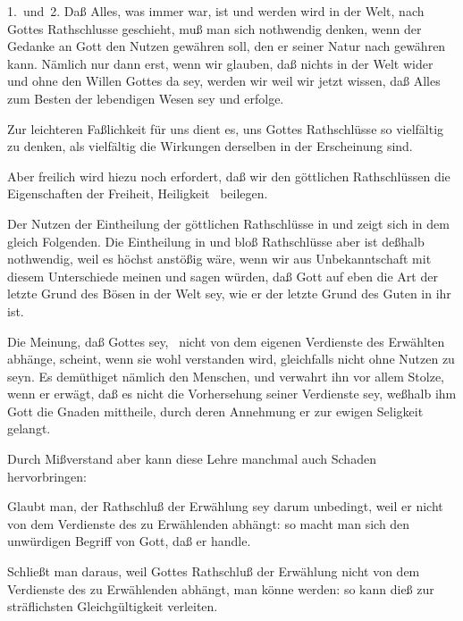 \begin{aufza}
\item[1.~und~2.] Daß Alles, was immer war, ist und werden wird in der Welt, nach Gottes Rathschlusse geschieht, muß man sich nothwendig denken, wenn der Gedanke an Gott den Nutzen gewähren soll, den er seiner Natur nach gewähren kann. Nämlich nur dann erst, wenn wir glauben, daß nichts in der Welt wider und ohne den Willen Gottes da sey, werden wir  weil wir jetzt wissen, daß Alles zum Besten der lebendigen Wesen sey und erfolge.
\item Zur leichteren Faßlichkeit für uns dient es, uns Gottes Rathschlüsse so vielfältig zu denken, als vielfältig die Wirkungen derselben in der Erscheinung sind.~
\item Aber freilich wird hiezu noch erfordert, daß wir den göttlichen Rathschlüssen die Eigenschaften der Freiheit, Heiligkeit \usw\ beilegen.
\item Der Nutzen der Eintheilung der göttlichen Rathschlüsse in  und  zeigt sich in dem gleich Folgenden. Die Eintheilung in  und bloß  Rathschlüsse aber ist deßhalb nothwendig, weil es höchst anstößig wäre, wenn wir aus Unbekanntschaft mit diesem Unterschiede meinen und sagen würden, daß Gott auf eben die Art der letzte Grund des Bösen in der Welt sey, wie er der letzte Grund des Guten in ihr ist.
\item Die Meinung, daß Gottes  sey, \dh\ nicht von dem eigenen Verdienste des Erwählten abhänge, scheint, wenn sie wohl verstanden wird, gleichfalls nicht ohne Nutzen zu seyn. Es demüthiget nämlich den Menschen, und verwahrt ihn vor allem Stolze, wenn er erwägt, daß es nicht die Vorhersehung seiner Verdienste sey, weßhalb ihm Gott die Gnaden mittheile, durch deren Annehmung er zur ewigen Seligkeit gelangt.
\begin{RWanm} 
Durch Mißverstand aber kann diese Lehre manchmal auch Schaden hervorbringen:
\begin{aufzb}
\item Glaubt man, der Rathschluß der Erwählung sey darum unbedingt, weil er nicht von dem Verdienste des zu Erwählenden abhängt: so macht man sich den unwürdigen Begriff von Gott, daß er  handle.
\item Schließt man daraus, weil Gottes Rathschluß der Erwählung nicht von dem Verdienste des zu Erwählenden abhängt, man könne  werden: so kann dieß zur sträflichsten Gleichgültigkeit verleiten.

\end{aufzb}
\end{RWanm}
\end{aufza}
